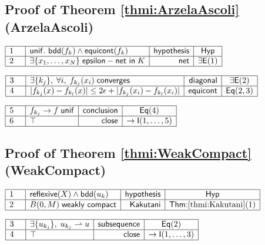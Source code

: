 \documentclass[11pt,reqno]{amsart}
\begin{document}
	\subsection*{Proof of Theorem \protect\ref{thmi:ArzelaAscoli} (\textsf{ArzelaAscoli})}
	\noindent$\begin{array}{|m{0.5cm}|l|r|c|}
	\hline
	1 & \mathsf{unif.\ bdd}(f_{k})\wedge\mathsf{equicont}(f_{k}) & \mathsf{hypothesis} & \mathsf{Hyp} \\ \hline
	2 & \exists\{x_{1},\dots,x_{N}\}\;\mathsf{epsilon-net\ in}\;K & \mathsf{net} & \exists\mathsf{E}(1) \\ \hline
	\end{array}$
	\par\nointerlineskip\noindent$\begin{array}{|m{0.5cm}|l|r|c|}
	\hline
	3 & \exists\{k_{j}\},\;\forall i,\;f_{k_{j}}(x_{i})\;\mathsf{converges} & \mathsf{diagonal} & \exists\mathsf{E}(2) \\ \hline
	4 & |f_{k_{j}}(x)-f_{k_{l}}(x)|\le2\epsilon+|f_{k_{j}}(x_{i})-f_{k_{l}}(x_{i})| & \mathsf{equicont} & \mathsf{Eq}(2,3) \\ \hline
	\end{array}$
	\par\nointerlineskip\noindent$\begin{array}{|m{0.5cm}|l|r|c|}
	\hline
	5 & f_{k_{j}}\to f\;\mathsf{unif} & \mathsf{conclusion} & \mathsf{Eq}(4) \\ \hline
	6 & \top & \mathsf{close} & \to\mathsf{I}(1,\dots,5) \\ \hline
	\end{array}$
	\medskip
	
	\subsection*{Proof of Theorem \protect\ref{thmi:WeakCompact} (\textsf{WeakCompact})}
	\noindent$\begin{array}{|m{0.5cm}|l|r|c|}
	\hline
	1 & \mathsf{reflexive}(X)\wedge\mathsf{bdd}(u_{k}) & \mathsf{hypothesis} & \mathsf{Hyp} \\ \hline
	2 & \bar{B}(0,M)\;\mathsf{weakly\ compact} & \mathsf{Kakutani} & \textsf{Thm:}\ref{thmi:Kakutani}(1) \\ \hline
	\end{array}$
	\par\nointerlineskip\noindent$\begin{array}{|m{0.5cm}|l|r|c|}
	\hline
	3 & \exists\{u_{k_{j}}\},\;u_{k_{j}}\rightharpoonup u & \mathsf{subsequence} & \mathsf{Eq}(2) \\ \hline
	4 & \top & \mathsf{close} & \to\mathsf{I}(1,\dots,3) \\ \hline
	\end{array}$
	\medskip
	
\end{document}
